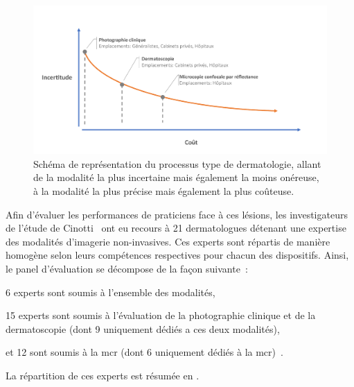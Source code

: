 \begin{figure}[H]
    \centering
    \includegraphics[width=\linewidth]{contents/chapter_4/resources/scheme_devices_location.pdf}
    \caption{Schéma de représentation du processus type de dermatologie, allant de la modalité la plus incertaine mais également la moins onéreuse, à la modalité la plus précise mais également la plus coûteuse.}
    \label{fig:scheme_devices_location}
\end{figure}\par

\addtocounter{footnote}{1}
\addtocounter{footnote}{1}
\addtocounter{footnote}{1}

Afin d'évaluer les performances de praticiens face à ces lésions, les investigateurs de l'étude de Cinotti~ ont eu recours à 21 dermatologues détenant une expertise des modalités d'imagerie non-invasives. Ces experts sont répartis de manière homogène selon leurs compétences respectives pour chacun des dispositifs. Ainsi, le panel d'évaluation se décompose de la façon suivante~:
\begin{inlinerate}
    \item 6 experts sont soumis à l'ensemble des modalités,
    \item 15 experts sont soumis à l'évaluation de la photographie clinique et de la dermatoscopie (dont 9 uniquement dédiés a ces deux modalités),
    \item et 12 sont soumis à la \gls{mcr} (dont 6 uniquement dédiés à la \gls{mcr})~\cite{Cinotti2018}.
\end{inlinerate}
La répartition de ces experts est résumée en .\par

